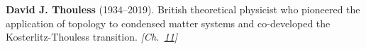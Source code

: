 \nobelphysics \textbf{David J. Thouless} (1934–2019). British theoretical physicist who pioneered the application of topology to condensed matter systems and co-developed the Kosterlitz-Thouless transition. \emph{[Ch.~\hyperref[ch:topologicalinsulators]{11}]}

